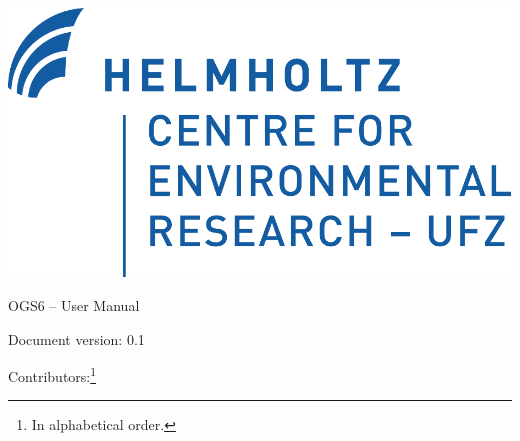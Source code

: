 \begin{titlepage}

\begin{flushright}
\includegraphics[height=0.1\textheight]{UFZ_logo}
\end{flushright}


\vspace{20mm}

\begin{center}
{\huge{OGS6 -- User Manual}}

\vfill
{\large{Document version: 0.1}}
\end{center}

\vspace{20mm}
{\large{Contributors:}}\footnote{In alphabetical order.}

{\large{
\@author}}

\end{titlepage}

